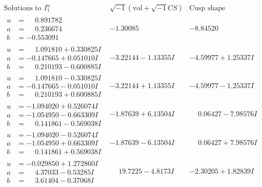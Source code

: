 \documentclass[1p]{elsarticle_modified}
\theoremstyle{definition}
\newcommand{\I}{\sqrt{-1}}
\begin{document}
$$\begin{array}{c|c|c}  
\text{Solutions to }I^u_{1}& \I (\text{vol} + \sqrt{-1}CS) & \text{Cusp shape}\\
 \hline 
\begin{aligned}
u &= \phantom{-}0.891782\phantom{ +0.000000I} \\
a &= \phantom{-}0.236674\phantom{ +0.000000I} \\
b &= -0.553091\phantom{ +0.000000I}\end{aligned}
 & -1.30085\phantom{ +0.000000I} & -8.84520\phantom{ +0.000000I} \\ \hline\begin{aligned}
u &= \phantom{-}1.091810 + 0.330825 I \\
a &= -0.147665 + 0.051010 I \\
b &= \phantom{-}0.210193 - 0.600885 I\end{aligned}
 & -3.22144 - 1.13355 I & -4.59977 + 1.25337 I \\ \hline\begin{aligned}
u &= \phantom{-}1.091810 - 0.330825 I \\
a &= -0.147665 - 0.051010 I \\
b &= \phantom{-}0.210193 + 0.600885 I\end{aligned}
 & -3.22144 + 1.13355 I & -4.59977 - 1.25337 I \\ \hline\begin{aligned}
u &= -1.094020 + 0.526074 I \\
a &= -1.054950 - 0.663309 I \\
b &= \phantom{-}0.141861 - 0.569038 I\end{aligned}
 & -1.87639 + 6.13504 I & \phantom{-}0.06427 - 7.98576 I \\ \hline\begin{aligned}
u &= -1.094020 - 0.526074 I \\
a &= -1.054950 + 0.663309 I \\
b &= \phantom{-}0.141861 + 0.569038 I\end{aligned}
 & -1.87639 - 6.13504 I & \phantom{-}0.06427 + 7.98576 I \\ \hline\begin{aligned}
u &= -0.029850 + 1.272860 I \\
a &= \phantom{-}4.37033 - 0.53285 I \\
b &= \phantom{-}3.61404 - 0.37068 I\end{aligned}
 & \phantom{-}19.7225 - 4.8173 I & -2.30205 + 1.82839 I \\ \hline\begin{aligned}

\end{aligned}
\end{array}$$
\end{document}
